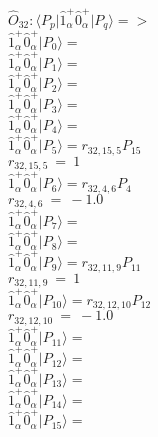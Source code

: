 \documentclass[14pt]{article}
\begin{document}
    $\hat{O}_{32}:  \langle{P_p}\vert \hat{1}_{\alpha}^{+}\hat{0}_{\alpha}^{+} \vert{P_q}\rangle => $ \\ 
    $ \hat{1}_{\alpha}^{+}\hat{0}_{\alpha}^{+} \vert{P_{0}}\rangle =  $ \\ 
    $ \hat{1}_{\alpha}^{+}\hat{0}_{\alpha}^{+} \vert{P_{1}}\rangle =  $ \\ 
    $ \hat{1}_{\alpha}^{+}\hat{0}_{\alpha}^{+} \vert{P_{2}}\rangle =  $ \\ 
    $ \hat{1}_{\alpha}^{+}\hat{0}_{\alpha}^{+} \vert{P_{3}}\rangle =  $ \\ 
    $ \hat{1}_{\alpha}^{+}\hat{0}_{\alpha}^{+} \vert{P_{4}}\rangle =  $ \\ 
    $ \hat{1}_{\alpha}^{+}\hat{0}_{\alpha}^{+} \vert{P_{5}}\rangle = {r}_{32,15,5}P_{15} $ \\ 
    ${r}_{32,15,5}\ =\ 1 $ \\ 
    $ \hat{1}_{\alpha}^{+}\hat{0}_{\alpha}^{+} \vert{P_{6}}\rangle = {r}_{32,4,6}P_{4} $ \\ 
    ${r}_{32,4,6}\ =\ -1.0 $ \\ 
    $ \hat{1}_{\alpha}^{+}\hat{0}_{\alpha}^{+} \vert{P_{7}}\rangle =  $ \\ 
    $ \hat{1}_{\alpha}^{+}\hat{0}_{\alpha}^{+} \vert{P_{8}}\rangle =  $ \\ 
    $ \hat{1}_{\alpha}^{+}\hat{0}_{\alpha}^{+} \vert{P_{9}}\rangle = {r}_{32,11,9}P_{11} $ \\ 
    ${r}_{32,11,9}\ =\ 1 $ \\ 
    $ \hat{1}_{\alpha}^{+}\hat{0}_{\alpha}^{+} \vert{P_{10}}\rangle = {r}_{32,12,10}P_{12} $ \\ 
    ${r}_{32,12,10}\ =\ -1.0 $ \\ 
    $ \hat{1}_{\alpha}^{+}\hat{0}_{\alpha}^{+} \vert{P_{11}}\rangle =  $ \\ 
    $ \hat{1}_{\alpha}^{+}\hat{0}_{\alpha}^{+} \vert{P_{12}}\rangle =  $ \\ 
    $ \hat{1}_{\alpha}^{+}\hat{0}_{\alpha}^{+} \vert{P_{13}}\rangle =  $ \\ 
    $ \hat{1}_{\alpha}^{+}\hat{0}_{\alpha}^{+} \vert{P_{14}}\rangle =  $ \\ 
    $ \hat{1}_{\alpha}^{+}\hat{0}_{\alpha}^{+} \vert{P_{15}}\rangle =  $ \\ 
    
\end{document}
